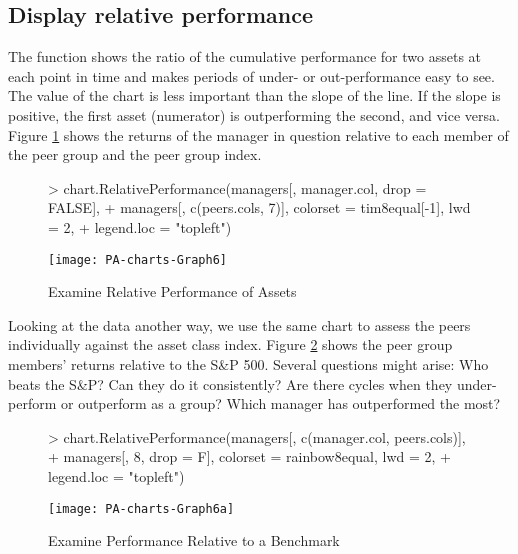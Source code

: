 \documentclass[12pt,letterpaper,english]{article}
\begin{document}
\subsection{Display relative performance}

The function  shows the ratio of the
cumulative performance for two assets at each point in time and
makes periods of under- or out-performance easy to see. The value
of the chart is less important than the slope of the line. If the
slope is positive, the first asset (numerator) is outperforming the second, and
vice versa. Figure \ref{fig:Examine-Relative-Performance} shows the
returns of the manager in question relative to each member of the
peer group and the peer group index.

%
\begin{figure}

\caption{Examine Relative Performance of Assets}

\label{fig:Examine-Relative-Performance}

\begin{center}

\begin{Schunk}
\begin{Sinput}
> chart.RelativePerformance(managers[, manager.col, drop = FALSE], 
+     managers[, c(peers.cols, 7)], colorset = tim8equal[-1], lwd = 2, 
+     legend.loc = "topleft")
\end{Sinput}
\end{Schunk}
\texttt{[image: PA-charts-Graph6]}

\end{center}
\end{figure}


Looking at the data another way, we use the same chart to assess the
peers individually against the asset class index. Figure \ref{fig:Examine-Performance-Relative2}
shows the peer group members' returns relative to the S\&P 500. Several
questions might arise: Who beats the S\&P? Can they do it consistently?
Are there cycles when they under-perform or outperform as a group?
Which manager has outperformed the most?

%
\begin{figure}

\caption{Examine Performance Relative to a Benchmark}

\label{fig:Examine-Performance-Relative2}

\begin{center}

\begin{Schunk}
\begin{Sinput}
> chart.RelativePerformance(managers[, c(manager.col, peers.cols)], 
+     managers[, 8, drop = F], colorset = rainbow8equal, lwd = 2, 
+     legend.loc = "topleft")
\end{Sinput}
\end{Schunk}
\texttt{[image: PA-charts-Graph6a]}

\end{center}
\end{figure}
\end{document}
